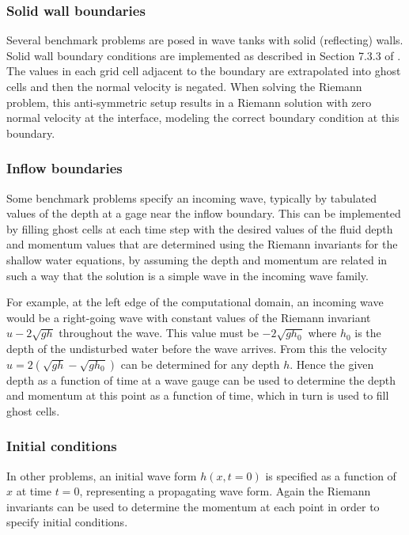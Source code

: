 \subsubsection{Solid wall boundaries}\label{sec:bc-solid}
Several benchmark problems are posed in wave tanks with solid (reflecting)
walls.  Solid wall
boundary conditions are implemented as described in Section 7.3.3 of
\cite{rjl:fvmhp}.  The values in each grid cell adjacent to the boundary are
extrapolated into ghost cells and then the normal velocity is negated.  When
solving the Riemann problem, this anti-symmetric setup results in a Riemann
solution with zero normal 
velocity at the interface, modeling the correct boundary 
condition at this boundary.

\subsubsection{Inflow boundaries}\label{sec:bc-inflow}
Some benchmark problems specify an incoming wave, typically by tabulated
values of the depth at a gage near the inflow boundary.  
This can be implemented by filling ghost cells at each time step
with the desired values of the fluid depth and momentum values that are
determined using the Riemann invariants for the shallow water equations,
by assuming the depth and momentum are related in such a way that the
solution is a simple wave in the incoming wave family.  

For example, at
the left edge of the computational domain, an incoming wave would be a
right-going wave with constant values of the
Riemann invariant $u - 2\sqrt{gh}$ throughout the wave.
This value must be $-2\sqrt{gh_0}$
where $h_0$ is the depth of the undisturbed water before the wave arrives.
From this the velocity $u = 2(\sqrt{gh} - \sqrt{gh_0})$ can be determined
for any depth $h$.  Hence the given depth as a function of time at a
wave gauge can be used to determine the depth and momentum at this
point as a function of time, which in turn is used to fill ghost
cells.

\subsubsection{Initial conditions}\label{sec:ic}
In other problems, an initial wave form $h(x,t=0)$ is specified as a
function of $x$ at time $t=0$, representing a propagating wave form.
Again the Riemann invariants can be used to
determine the momentum at each point in order to specify initial
conditions.

